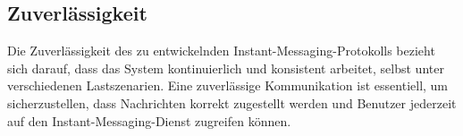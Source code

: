 \subsection{Zuverlässigkeit}

Die Zuverlässigkeit des zu entwickelnden Instant-Messaging-Protokolls bezieht sich darauf, dass das System kontinuierlich und konsistent arbeitet, selbst unter verschiedenen Lastszenarien. Eine zuverlässige Kommunikation ist essentiell, um sicherzustellen, dass Nachrichten korrekt zugestellt werden und Benutzer jederzeit auf den Instant-Messaging-Dienst zugreifen können.